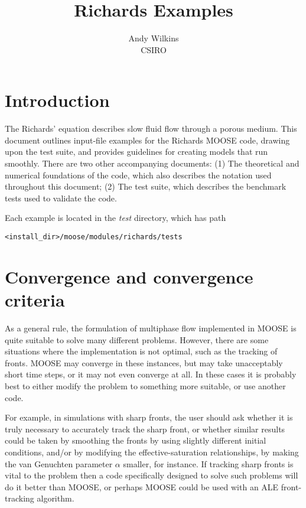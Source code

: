 \documentclass[]{scrreprt}
\begin{document}
\title{Richards Examples}
\author{Andy Wilkins \\
CSIRO}
\maketitle

\tableofcontents

\chapter{Introduction}

The Richards' equation describes slow fluid flow through a porous
medium.  This document outlines input-file examples for the Richards
MOOSE code, drawing upon the test suite, and provides guidelines for
creating models that run smoothly.  There are two other accompanying
documents: (1) The theoretical and numerical foundations of the code,
which also describes the notation used throughout this document; (2)
The test suite, which describes the benchmark tests used to validate
the code.

Each example is located in the {\em test} directory, which has path
\begin{verbatim}
<install_dir>/moose/modules/richards/tests
\end{verbatim}



\chapter{Convergence and convergence criteria}

As a general rule, the formulation of multiphase flow implemented in
MOOSE is quite suitable to solve many different problems.  However,
there are some situations where the implementation is not optimal,
such as the tracking of fronts.  MOOSE may converge in these
instances, but may take unacceptably short time steps, or it may not
even converge at all.  In these cases it is probably best to either
modify the problem to something more suitable, or use another code.

For example, in simulations with sharp fronts, the user should ask
whether it is truly necessary to accurately track the sharp front, or
whether similar results could be taken by smoothing the fronts by
using slightly different initial conditions, and/or by modifying the
effective-saturation relationships, by making the van Genuchten
parameter $\alpha$ smaller, for instance.  If tracking sharp fronts is
vital to the problem then a code specifically designed to solve such
problems will do it better than MOOSE, or perhaps MOOSE could be used
with an ALE front-tracking algorithm.
\end{document}
